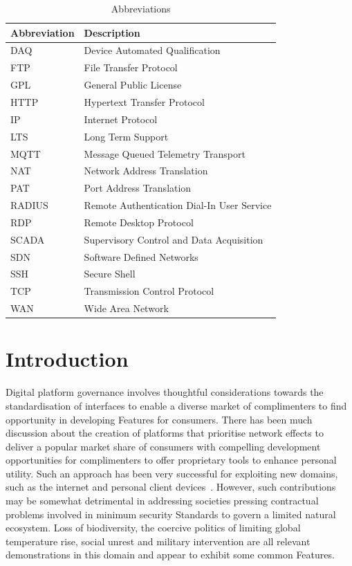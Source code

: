 \documentclass[11pt, oneside]{article}   	%
\begin{document}
\begin{table}[H]
\caption{Abbreviations}
\begin{center}
\begin{tabular}{| l | l |}
\hline
Abbreviation&Description\\
\hline
DAQ&Device Automated Qualification\\
FTP&File Transfer Protocol\\
GPL&General Public License\\
HTTP&Hypertext Transfer Protocol\\
IP&Internet Protocol\\
LTS&Long Term Support\\
MQTT&Message Queued Telemetry Transport\\
NAT&Network Address Translation\\
PAT&Port Address Translation\\
RADIUS&Remote Authentication Dial-In User Service\\
RDP&Remote Desktop Protocol\\
SCADA&Supervisory Control and Data Acquisition\\
SDN&Software Defined Networks\\
SSH&Secure Shell\\
TCP&Transmission Control Protocol\\
WAN&Wide Area Network\\
\hline
\end{tabular}
\end{center}
\label{Abbreviations}
\end{table}

\newpage

\tableofcontents

\newpage
\thispagestyle{empty}
\mbox{}
\newpage

\section{Introduction}
Digital platform governance involves thoughtful considerations towards the standardisation of interfaces to enable a diverse market of complimenters to find opportunity in developing Features for consumers.
There has been much discussion about the creation of platforms that prioritise network effects to deliver a popular market share of consumers with compelling development opportunities for complimenters to offer proprietary tools to enhance personal utility.
Such an approach has been very successful for exploiting new domains, such as the internet and personal client devices~\cite{bop1}.
However, such contributions may be somewhat detrimental in addressing societies pressing contractual problems involved in minimum security Standards to govern a limited natural ecosystem.
Loss of biodiversity, the coercive politics of limiting global temperature rise, social unrest and military intervention are all relevant demonstrations in this domain and appear to exhibit some common Features.\
\end{document}
